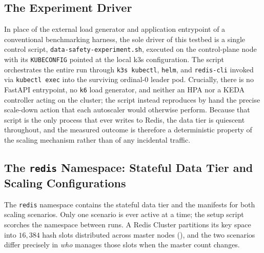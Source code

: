 \subsection{The Experiment Driver}
\label{subsec:driver}

In place of the external load generator and application entrypoint of a conventional
benchmarking harness, the sole driver of this testbed is a single control script,
\texttt{data-safety-experiment.sh}, executed on the control-plane node with its
\texttt{KUBECONFIG} pointed at the local k3s configuration. The script orchestrates the
entire run through \texttt{k3s kubectl}, \texttt{helm}, and \texttt{redis-cli} invoked via
\texttt{kubectl exec} into the surviving ordinal-$0$ leader pod. Crucially, there is no
FastAPI entrypoint, no \texttt{k6} load generator, and neither an HPA nor a KEDA controller
acting on the cluster; the script instead reproduces by hand the precise scale-down action
that each autoscaler would otherwise perform. Because that script is the only process that
ever writes to Redis, the data tier is quiescent throughout, and the measured outcome is
therefore a deterministic property of the scaling mechanism rather than of any incidental
traffic.

\subsection{The \texttt{redis} Namespace: Stateful Data Tier and Scaling Configurations}
\label{subsubsec:ns-redis}

The \texttt{redis} namespace contains the stateful data tier and the manifests for both
scaling scenarios. Only one scenario is ever active at a time; the setup script scorches the
namespace between runs. A Redis Cluster partitions its key space into $16{,}384$ hash slots
distributed across master nodes (\cite{redis:clusterspec}), and the two scenarios differ
precisely in \emph{who} manages those slots when the master count changes.

